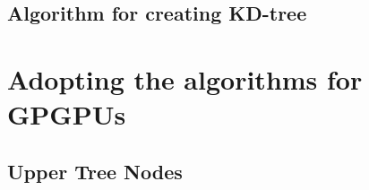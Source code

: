 




\subsection{Algorithm for creating KD-tree}




\section{Adopting the algorithms for GPGPUs}





\subsection{Upper Tree Nodes}






